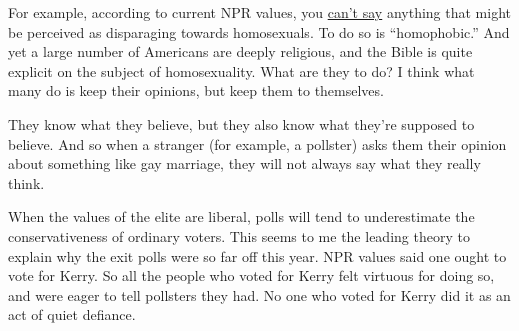 For example, according to current NPR values, you \href{say.html}{can't
say} anything that might be perceived as disparaging towards
homosexuals. To do so is ``homophobic.'' And yet a large number of
Americans are deeply religious, and the Bible is quite explicit on the
subject of homosexuality. What are they to do? I think what many do is
keep their opinions, but keep them to themselves.

They know what they believe, but they also know what they're supposed to
believe. And so when a stranger (for example, a pollster) asks them
their opinion about something like gay marriage, they will not always
say what they really think.

When the values of the elite are liberal, polls will tend to
underestimate the conservativeness of ordinary voters. This seems to me
the leading theory to explain why the exit polls were so far off this
year. NPR values said one ought to vote for Kerry. So all the people who
voted for Kerry felt virtuous for doing so, and were eager to tell
pollsters they had. No one who voted for Kerry did it as an act of quiet
defiance.
